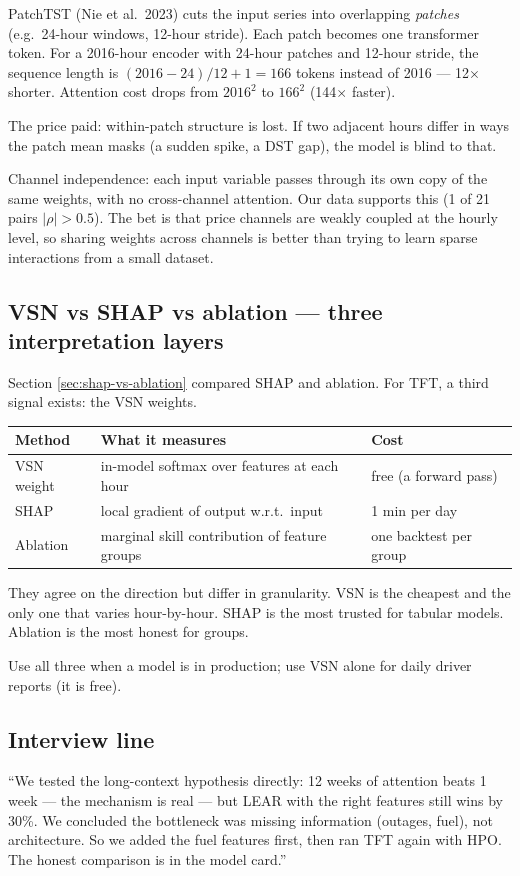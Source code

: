 PatchTST (Nie et al.\ 2023) cuts the input series into overlapping
\emph{patches} (e.g.\ 24-hour windows, 12-hour stride). Each patch
becomes one transformer token. For a 2016-hour encoder with 24-hour
patches and 12-hour stride, the sequence length is
$(2016 - 24) / 12 + 1 = 166$ tokens instead of 2016 --- 12$\times$ shorter.
Attention cost drops from $2016^2$ to $166^2$ (144$\times$ faster).

The price paid: within-patch structure is lost. If two adjacent hours
differ in ways the patch mean masks (a sudden spike, a DST gap),
the model is blind to that.

Channel independence: each input variable passes through its own
copy of the same weights, with no cross-channel attention. Our data
supports this (1 of 21 pairs $|\rho| > 0.5$). The bet is that
price channels are weakly coupled at the hourly level, so sharing
weights across channels is better than trying to learn sparse interactions
from a small dataset.

\subsection{VSN vs SHAP vs ablation --- three interpretation layers}

Section \ref{sec:shap-vs-ablation} compared SHAP and ablation. For TFT,
a third signal exists: the VSN weights.

\begin{center}
\begin{tabular}{lll}
Method & What it measures & Cost \\
\hline
VSN weight & in-model softmax over features at each hour & free (a forward pass) \\
SHAP & local gradient of output w.r.t.\ input & 1 min per day \\
Ablation & marginal skill contribution of feature groups & one backtest per group \\
\end{tabular}
\end{center}

They agree on the direction but differ in granularity. VSN is the cheapest
and the only one that varies hour-by-hour. SHAP is the most trusted for
tabular models. Ablation is the most honest for groups.

Use all three when a model is in production; use VSN alone for daily
driver reports (it is free).

\subsection{Interview line}

``We tested the long-context hypothesis directly: 12 weeks of attention
beats 1 week --- the mechanism is real --- but LEAR with the right
features still wins by 30\%. We concluded the bottleneck was missing
information (outages, fuel), not architecture. So we added the fuel
features first, then ran TFT again with HPO. The honest comparison is
in the model card.''

